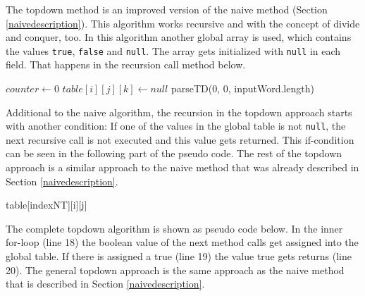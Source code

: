 \documentclass[a4paper, 11pt]{article}
\begin{document}

The topdown method is an improved version of the naive method (Section \ref{naivedescription}). This algorithm works recursive and with the concept of divide and conquer, too. In this algorithm another global array is used, which contains the values \texttt{true}, \texttt{false} and \texttt{null}. The array gets initialized with \texttt{null} in each field. That happens in the recursion call method below.

\begin{center}
\begin{algorithmic}[1]
\State $counter \gets 0$
\State $table[i][j][k] \gets null$
\EndFor
\EndFor
\EndFor
\State \Return parseTD(0, 0, inputWord.length)
\end{algorithmic}
\hrulefill
\end{center}

Additional to the naive algorithm, the recursion in the topdown approach starts with another condition: If one of the values in the global table is not \texttt{null}, the next recursive call is not executed and this value gets returned. This if-condition can be seen in the following part of the pseudo code. The rest of the topdown approach is a similar approach to the naive method that was already described in Section \ref{naivedescription}.

\begin{center}
\begin{algorithmic}[1]
\State \Return table[indexNT][i][j]
\EndIf
\end{algorithmic}
\hrulefill
\end{center}

The complete topdown algorithm is shown as pseudo code below. In the inner for-loop (line 18) the boolean value of the next method calls get assigned into the global table. If there is assigned a true (line 19) the value true gets returns (line 20). The general topdown approach is the same approach as the naive method that is described in Section \ref{naivedescription}.
\end{document}
